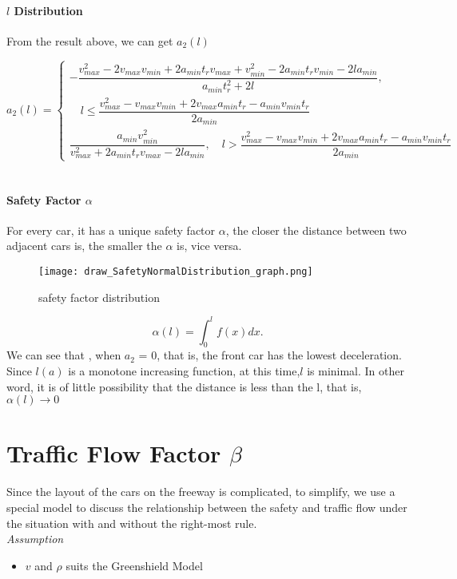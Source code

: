 \paragraph{$l${ } Distribution}
From the result above, we can get $a_2(l)$

\[ a_2(l) = \begin{cases}
-\dfrac{v_{max}^2 - 2v_{max}v_{min} + 2a_{min}t_rv_{max} + v_{min}^2 - 2a_{min}t_rv_{min} - 2la_{min}}{a_{min}t_r^2 + 2l}, 
\\

\quad l \leq \dfrac{v_{max}^2 - v_{max}v_{min} + 2v_{max}a_{min}t_r - a_{min} v_{min}t_r}{2a_{min}}\\
\dfrac{a_{min}v_{min}^2}{v_{max}^2 + 2a_{min}t_rv_{max} - 2la_{min}}, \quad  l > \dfrac{v_{max}^2 - v_{max}v_{min} + 2v_{max}a_{min}t_r - a_{min} v_{min}t_r}{2a_{min}}
\end{cases}\]
\\

\paragraph{Safety Factor $\alpha$}
For every car, it has a unique safety factor $\alpha$, the 
closer the distance between two adjacent cars is, the smaller 
the $\alpha$ is, vice versa.\\

\begin{figure}[h]
\small
\centering
\texttt{[image: draw\_SafetyNormalDistribution\_graph.png]}
\caption{safety factor distribution} \label{fig: safety factor distribution}
\end{figure}
\begin{displaymath}
\alpha(l) = \int_{0}^{l} f(x) dx.
\end{displaymath}
We can see that , when $a_2$ = 0, that is, the front car 
has the lowest deceleration. Since $l(a)$ is a monotone 
increasing function, at this time,$l$ is minimal. In other 
word, it is of little possibility that the distance is less 
than the l, that is, $\alpha(l) \rightarrow 0$                     


\section{Traffic Flow Factor $\beta$}\label{sec: Traffic Flow Factor}
Since the layout of the cars on the freeway is complicated, 
to simplify, we use a special model to discuss the 
relationship between the safety and traffic flow under the 
situation with and without the right-most rule.
\\
\emph{Assumption}
\begin{itemize}
\item $v$ and $\rho$ suits the Greenshield Model
\end{itemize}


